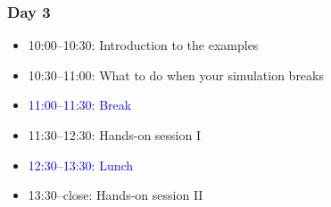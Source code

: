 
\begin{frame}
  \frametitle{Day 3}
  \begin{itemize}[]
  \item[] 10:00--10:30: Introduction to the examples
  \item[] 10:30--11:00: What to do when your simulation breaks
  \item[] \textcolor{blue}{11:00--11:30: Break}
  \item[] 11:30--12:30: Hands-on session I
  \item[] \textcolor{blue}{12:30--13:30: Lunch}
  \item[] 13:30--close: Hands-on session II
  \end{itemize}
\end{frame}
